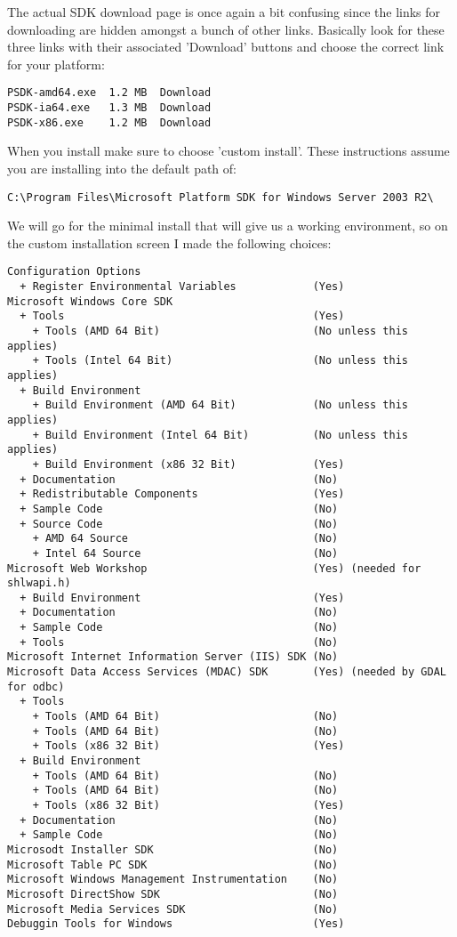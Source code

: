 The actual SDK download page is once again a bit confusing since the links for 
downloading are hidden amongst a bunch of other links. Basically look for these 
three links with their associated 'Download' buttons and choose the correct 
link for your platform:

\begin{verbatim}
PSDK-amd64.exe  1.2 MB  Download 
PSDK-ia64.exe   1.3 MB  Download 
PSDK-x86.exe    1.2 MB  Download
\end{verbatim}

When you install make sure to choose 'custom install'. These instructions 
assume you are installing into the default path of:

\begin{verbatim}
C:\Program Files\Microsoft Platform SDK for Windows Server 2003 R2\
\end{verbatim}

We will go for the minimal install that will give us a working environment, 
so on the custom installation screen I made the following choices:

\begin{verbatim}
Configuration Options
  + Register Environmental Variables            (Yes)
Microsoft Windows Core SDK
  + Tools                                       (Yes)
    + Tools (AMD 64 Bit)                        (No unless this applies)
    + Tools (Intel 64 Bit)                      (No unless this applies)
  + Build Environment
    + Build Environment (AMD 64 Bit)            (No unless this applies)
    + Build Environment (Intel 64 Bit)          (No unless this applies)
    + Build Environment (x86 32 Bit)            (Yes)
  + Documentation                               (No)
  + Redistributable Components                  (Yes)
  + Sample Code                                 (No)
  + Source Code                                 (No)
    + AMD 64 Source                             (No)
    + Intel 64 Source                           (No)
Microsoft Web Workshop                          (Yes) (needed for shlwapi.h)
  + Build Environment                           (Yes)
  + Documentation                               (No)
  + Sample Code                                 (No)
  + Tools                                       (No)
Microsoft Internet Information Server (IIS) SDK (No)
Microsoft Data Access Services (MDAC) SDK       (Yes) (needed by GDAL for odbc)
  + Tools
    + Tools (AMD 64 Bit)                        (No)
    + Tools (AMD 64 Bit)                        (No)
    + Tools (x86 32 Bit)                        (Yes)
  + Build Environment
    + Tools (AMD 64 Bit)                        (No)
    + Tools (AMD 64 Bit)                        (No)
    + Tools (x86 32 Bit)                        (Yes)
  + Documentation                               (No)
  + Sample Code                                 (No)
Microsodt Installer SDK                         (No)
Microsoft Table PC SDK                          (No)
Microsoft Windows Management Instrumentation    (No)
Microsoft DirectShow SDK                        (No)
Microsoft Media Services SDK                    (No)
Debuggin Tools for Windows                      (Yes)
\end{verbatim}

